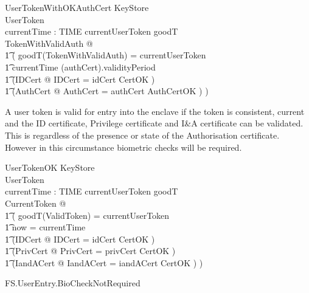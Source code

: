 \begin{schema}{UserTokenWithOKAuthCert}
        KeyStore
\\      UserToken
\\      currentTime : TIME
\where
        currentUserToken \in \ran goodT
\\	\exists TokenWithValidAuth @ 
\\ \t1		(
		goodT(\theta TokenWithValidAuth) = currentUserToken
\\ \t1		\land currentTime \in (\The authCert).validityPeriod
\\ \t1          \land (\exists IDCert @ \theta IDCert = idCert \land CertOK )
\\ \t1          \land (\exists AuthCert @ \theta AuthCert = \The
authCert \land AuthCertOK )  
		)
\end{schema}



A user token is valid for entry into the enclave if the token is
consistent, current and the ID
certificate, Privilege certificate and I\&A certificate can be validated. This is regardless of the
presence or state of the Authorisation certificate. However in this
circumstance biometric checks will be required.

\begin{schema}{UserTokenOK}
        KeyStore
\\      UserToken
\\      currentTime : TIME
\where
 	currentUserToken \in \ran goodT
\\	\exists CurrentToken @ 
\\ \t1		(
		goodT(\theta ValidToken) = currentUserToken
\\ \t1		\land now = currentTime
\\ \t1          \land (\exists IDCert @ \theta IDCert = idCert \land CertOK )
\\ \t1          \land (\exists PrivCert @ \theta PrivCert = privCert
\land CertOK )
\\ \t1          \land (\exists IandACert @ \theta IandACert =
iandACert \land CertOK )  
                )
\end{schema}

\begin{traceunit}{FS.UserEntry.BioCheckNotRequired}
\end{traceunit}

